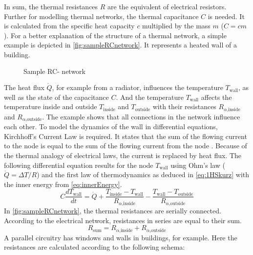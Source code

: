    In sum, the thermal resistances $R$ are the equivalent of electrical resistors.
    Further for modelling thermal networks, the thermal capacitance $C$ is needed. It is calculated from the specific heat capacity $c$ multiplied by the mass $m$ ($C=cm$).
    \newline
    For a better explanation of the structure of a thermal network, a simple example is depicted in \autoref{fig:sampleRCnetwork}. It represents a heated wall of a building.
    \begin{figure}[h]
    \centering
    \def\svgwidth{300pt}
    
    \caption{Sample RC- network}
    \label{fig:sampleRCnetwork}
    \end{figure}
    The heat flux $\dot{Q}$, for example from a radiator, influences the temperature $T_\text{wall}$, as well as the state of the capacitance $C$. And the temperature $T_\text{wall}$ affects the temperature inside and outside $T_\text{inside}$ and $T_\text{outside}$ with their resistances $R_{\alpha \text{,inside}}$ and $R_{\alpha \text{,outside}}$. The example shows that all connections in the network influence each other.
    To model the dynamics of the wall in differential equations, Kirchhoff's Current Law is required. It states that the sum of the flowing current to the node is equal to the sum of the flowing current from the node 
    \cite{Kuchling.2007}. 
    Because of the thermal analogy of electrical laws, the current is replaced by heat flux. The following differential equation results for the node  $T_\text{wall}$ using Ohm's law ($\dot{Q}=\Delta T/R$) and the first law of thermodynamics as deduced in \autoref{eq:1HSkurz} with the inner energy from \autoref{eq:innerEnergy}.     
    \begin{equation}
    \label{eq:sampledifferential}
    C \frac{d T_\text{wall}}{d t} = \dot{Q} + \frac{T_\text{inside}-T_\text{wall}}{R_{\alpha \text{,inside}}} - \frac{T_\text{wall}-T_\text{outside}}{R_{\alpha\text{,outside}}}
    \end{equation}
    In \autoref{fig:sampleRCnetwork}, the thermal resistances are serially connected. According to the electrical network, resistances in series are equal to their sum. 
    \begin{equation}
    \label{eq:resistanceseriel}
        R_\text{sum} = R_{\alpha \text{,inside}} + R_{\alpha \text{,outside}}
    \end{equation}
    A parallel circuitry has windows and walls in buildings, for example. Here the resistances are calculated according to the following schema:
